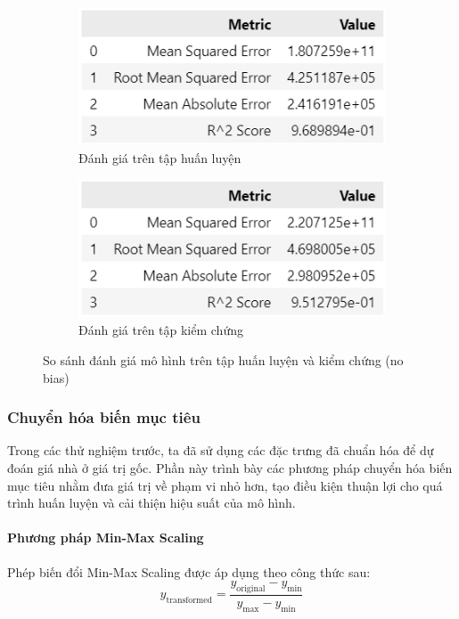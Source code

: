 \begin{figure}[H]
    \centering
    \begin{subfigure}[b]{0.48\textwidth}
        \centering
        \includegraphics[width=\linewidth]{img_multiple/metrics_no_bias_train.png}
        \caption{Đánh giá trên tập huấn luyện}
    \end{subfigure}
    \hfill
    \begin{subfigure}[b]{0.48\textwidth}
        \centering
        \includegraphics[width=\linewidth]{img_multiple/metrics_no_bias_val.png}
        \caption{Đánh giá trên tập kiểm chứng}
    \end{subfigure}
    \caption{So sánh đánh giá mô hình trên tập huấn luyện và kiểm chứng (no bias)} 
\end{figure}

\subsubsection{Chuyển hóa biến mục tiêu}
Trong các thử nghiệm trước, ta đã sử dụng các đặc trưng đã chuẩn hóa để dự đoán giá nhà ở giá trị gốc. Phần này trình bày các phương pháp chuyển hóa biến mục tiêu nhằm đưa giá trị về phạm vi nhỏ hơn, tạo điều kiện thuận lợi cho quá trình huấn luyện và cải thiện hiệu suất của mô hình.

\paragraph{Phương pháp Min-Max Scaling}
Phép biến đổi Min-Max Scaling được áp dụng theo công thức sau:
\[
    y_{\text{transformed}} = \frac{y_{\text{original}} - y_{\text{min}}}{y_{\text{max}} - y_{\text{min}}}
\]

